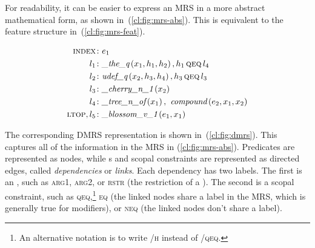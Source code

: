 \documentclass[output=paper,biblatex,babelshorthands,newtxmath,draftmode,colorlinks,citecolor=brown]{langscibook}
\begin{document}
\noindent
For readability, it can be easier to express an MRS
in a more abstract mathematical form, as shown in~(\ref{cl:fig:mrs-abs}).
This is equivalent to the feature structure in~(\ref{cl:fig:mrs-feat}).

\begin{exe}
	\setlength{\abovedisplayskip}{1ex}
	\setlength{\belowdisplayskip}{1ex}
	\ex\label{cl:fig:mrs-abs}
	\begin{minipage}[c]{.6\textwidth}
	\vspace*{-1\baselineskip}
	\begin{align*}
	    \textsc{index}\colon & e_1 \\
		l_1\colon & \textit{\_the\_q}\left(x_1,h_1,h_2\right), h_1 \,\textsc{qeq}\, l_4 \\
		l_2\colon & \textit{udef\_q}\left(x_2,h_3,h_4\right), h_3 \,\textsc{qeq}\, l_3 \\
		l_3\colon & \textit{\_cherry\_n\_1}\left(x_2\right) \\
		l_4\colon & \textit{\_tree\_n\_of}\left(x_1\right), \textit{ compound}\left(e_2,x_1,x_2\right) \\
		\textsc{ltop}, l_5\colon & \textit{\_blossom\_v\_1}\left(e_1,x_1\right)
	\end{align*}
	\end{minipage}
\end{exe}

The corresponding DMRS
representation is shown in~(\ref{cl:fig:dmrs}).
This captures all of the information
in the MRS in (\ref{cl:fig:mrs-abs}).
Predicates are represented as nodes,
while s and scopal constraints are represented as directed edges,
called \textit{dependencies} or \textit{links}.
Each dependency has two labels.
The first is an ,
such as \textsc{arg1}, \textsc{arg2},
or \textsc{rstr} (the restriction of a ).
The second is a scopal constraint,
such as \textsc{qeq},\footnote{%
	An alternative notation is to write
	\textsc{/h} instead of \textsc{/qeq}.
}
\textsc{eq} (the linked nodes share a label in the MRS,
which is generally true for modifiers),
or \textsc{neq} (the linked nodes don't share a label).
\end{document}
